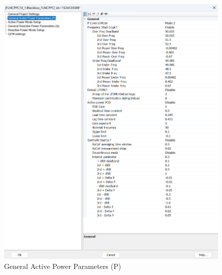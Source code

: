 \documentclass{../grid-link-report}
\begin{document}
		\begin{figure}[H]
		\centering
		\includegraphics[width=\textwidth]{report-assets/images/General Active Power Parameters (P).png}
		\caption{General Active Power Parameters (P)}
		\label{fig:General Active Power Parameters (P)}
	\end{figure}
	
\end{document}
